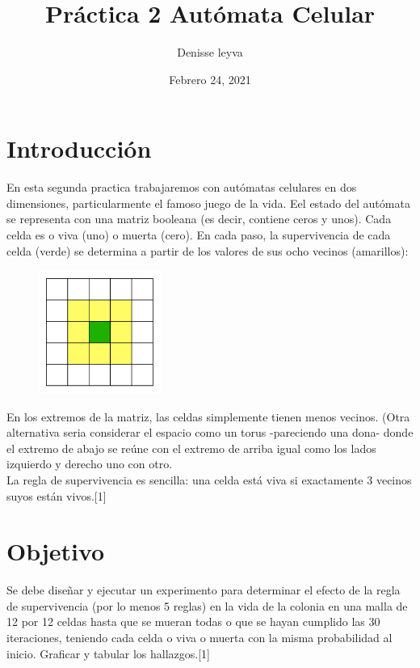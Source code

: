 \documentclass{article}
\title{Práctica 2 Autómata Celular}
\author{Denisse leyva}
\date{Febrero 24, 2021}
\begin{document}
\maketitle

\section{Introducción}
En esta segunda practica trabajaremos con autómatas celulares en dos dimensiones, particularmente el famoso juego de la vida. Eel estado del autómata se representa con una matriz booleana (es decir, contiene ceros y unos). Cada celda es o viva (uno) o muerta (cero). En cada paso, la supervivencia de cada celda (verde) se determina a partir de los valores de sus ocho vecinos (amarillos):\\

\begin{figure}[H]
\includegraphics[width=40mm]{p2v.png}
\end{figure}

En los extremos de la matriz, las celdas simplemente tienen menos vecinos. (Otra alternativa seria considerar el espacio como un torus -pareciendo una dona- donde el extremo de abajo se reúne con el extremo de arriba igual como los lados izquierdo y derecho uno con otro.\\
La regla de supervivencia es sencilla: una celda está viva si exactamente 3 vecinos suyos están vivos.[1]


\section{Objetivo}
Se debe diseñar y ejecutar un experimento para determinar el efecto de la regla de supervivencia (por lo menos 5 reglas) en la vida de la colonia en una malla de 12 por 12 celdas hasta que se mueran todas o que se hayan cumplido las 30 iteraciones, teniendo cada celda o viva o muerta con la misma probabilidad al inicio. Graficar y tabular los hallazgos.[1]
\end{document}
